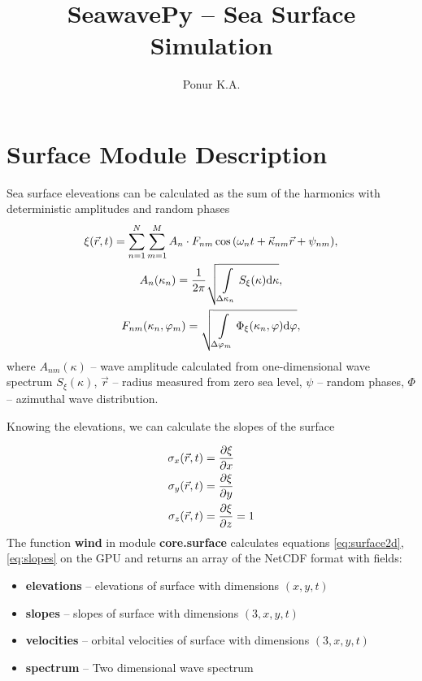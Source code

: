 

%

\setcounter{secnumdepth}{0}
\title{SeawavePy -- Sea Surface Simulation}
\author{Ponur K.A.}
\date{}


\newcommand{\python}{\textbf}

\maketitle

\section{Surface Module Description}
Sea surface eleveations can be calculated as the sum of the harmonics with
deterministic amplitudes and random phases
\begin{gather}
    \label{eq:surface2d}
    \xi(\vec r,t) = \sum\limits_{n=1}^{N} \sum\limits_{m=1}^{M}
    A_{n} \cdot
    F_{nm} \cos \qty(\omega_n t + \vec \kappa_{nm} \vec r + \psi_{nm}), \\
    A_n(\kappa_n) = \frac{1}{2 \pi} \sqrt{\int\limits_{\Delta \kappa_n} 
        S_\xi(\kappa)
    \dd \kappa}, \\
    F_{nm}(\kappa_n,\varphi_m) = \sqrt{\int\limits_{\Delta \varphi_m}
    \Phi_{\xi }(\kappa_n,\varphi) \dd \varphi},
\end{gather}
where $A_{nm}(\kappa)$ -- wave amplitude calculated from one-dimensional
wave spectrum $S_\xi(\kappa)$,  $\vec r$ --
radius measured from zero sea level,  $\psi$ -- random phases,  $\Phi$ -- azimuthal wave distribution.

Knowing the elevations, we can calculate the slopes  of the surface


\begin{equation}
    \label{eq:slopes}
    \begin{aligned}
        \sigma_x(\vec r,t) & = \pdv{\xi}{x} \\
        \sigma_y(\vec r,t) & = \pdv{\xi}{y} \\
        \sigma_z(\vec r,t) & = \pdv{\xi}{z} =  1 
    \end{aligned}
\end{equation}
The function \python{wind} in module \python{core.surface} calculates equations \eqref{eq:surface2d},
\eqref{eq:slopes} on the GPU and returns an array of the NetCDF format
with fields:
\begin{itemize}
    \item \python{elevations} -- elevations of surface with dimensions
        $(x,y,t)$
    \item \python{slopes} -- slopes of surface with dimensions
        $(3, x,y,t)$
    \item \python{velocities}
    -- orbital velocities of surface with dimensions
        $(3, x,y,t)$
    \item \python{spectrum} -- Two dimensional wave spectrum
\end{itemize}

